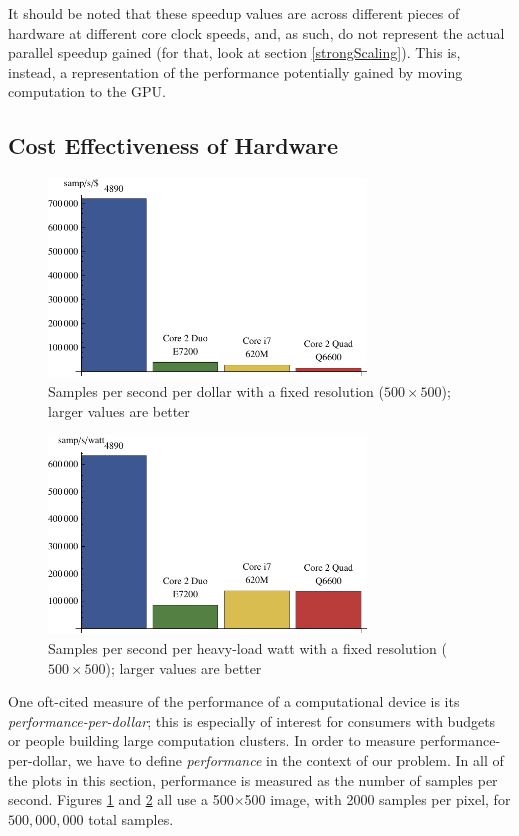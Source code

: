 \documentclass{acmsiggraph}
\begin{document}
It should be noted that these speedup values are across different pieces of hardware at different core clock speeds, and, as such, do not represent the actual parallel speedup gained (for that, look at section \ref{strongScaling}). This is, instead, a representation of the performance potentially gained by moving computation to the GPU.

\subsection{Cost Effectiveness of Hardware}

\begin{figure}
    \includegraphics[width=84.5mm]{dollarPlot.pdf}
    \caption{Samples per second per dollar with a fixed resolution ($500\times500$); larger values are better}
    \label{fig:costEffectiveness}
\end{figure}

\begin{figure}
    \includegraphics[width=84.5mm]{wattPlot.pdf}
    \caption{Samples per second per heavy-load watt with a fixed resolution ($500\times500$); larger values are better}
    \label{fig:wattPlot}
\end{figure}

One oft-cited measure of the performance of a computational device is its {\it performance-per-dollar}; this is especially of interest for consumers with budgets or people building large computation clusters. In order to measure performance-per-dollar, we have to define {\it performance} in the context of our problem. In all of the plots in this section, performance is measured as the number of samples per second. Figures \ref{fig:costEffectiveness} and \ref{fig:wattPlot} all use a 500$\times$500 image, with 2000 samples per pixel, for $500,000,000$ total samples.
\end{document}
